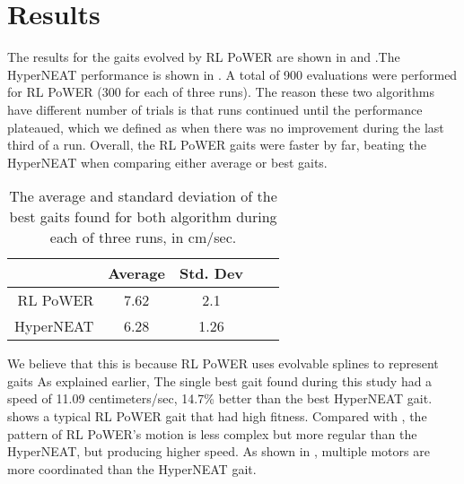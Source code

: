 \section{Results}
The results for the gaits evolved by RL PoWER are shown in  and .The HyperNEAT performance is shown in . A total of 900 evaluations were performed for RL PoWER (300 for each of three runs). The reason these two algorithms have different number of trials is that runs continued until the performance plateaued, which we defined as when there was no improvement during the last third of a run. Overall, the RL PoWER gaits were
faster by far, beating the HyperNEAT when comparing
either average or best gaits.


\begin{table}
\begin{center}
\begin{tabular}{|r|c|c|c||c|}
\hline
                                         & Average & Std. Dev \\
\hline                                    
\hline                                    
RL PoWER                       & 7.62  &    2.1   \\
\hline
HyperNEAT                      & 6.28   &   1.26   \\
\hline
\end{tabular}
\caption{The average and standard deviation of the best gaits found
  for both algorithm during each of three runs, in cm/sec.}  
\end{center}
\end{table}



We believe that this is because RL PoWER uses evolvable splines to represent gaits As explained earlier,  
The single best gait found during this study had a speed of 11.09 centimeters/sec,  14.7\% better than the best HyperNEAT gait.  shows a typical RL PoWER gait that had high fitness. Compared with , the pattern of RL PoWER's motion is less
complex but more regular than the HyperNEAT, but producing higher speed. As shown in 
, multiple motors are more coordinated than the HyperNEAT gait. 

